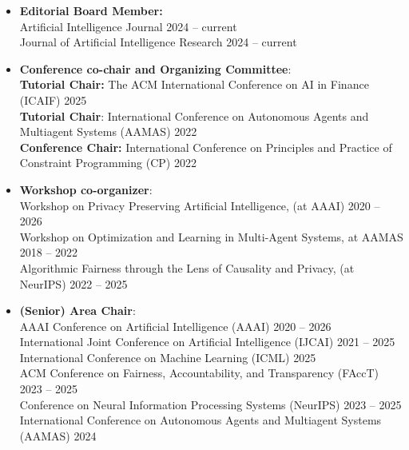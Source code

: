 \documentclass[localFont,alternative]{documentMETADATA}
\begin{document}
\vspace{6pt}
\vspace{6pt}
  \begin{itemize}
  	\item {\bf Editorial Board Member:}\\
  	Artificial Intelligence Journal \hfill{2024 -- current}\\
  	Journal of Artificial Intelligence Research \hfill{2024 -- current}

    \item {\bf Conference co-chair and Organizing Committee}:  \\
		{\bf Tutorial Chair:} The ACM International Conference on AI in Finance (ICAIF) \hfill{2025}\\
		{\bf Tutorial Chair}:  International Conference on Autonomous Agents and Multiagent Systems (AAMAS) \hfill{2022}\\
    {\bf Conference Chair:} International Conference on Principles and Practice of Constraint Programming (CP)  \hfill{2022}
		
    \item {\bf Workshop co-organizer}: \\
    {Workshop on Privacy Preserving Artificial Intelligence, (at AAAI)}   \hfill{2020 -- 2026}\\
    {Workshop on Optimization and Learning in Multi-Agent Systems, at AAMAS} \hfill{2018 -- 2022}\\
    {Algorithmic Fairness through the Lens of Causality and Privacy, (at NeurIPS)} \hfill{2022 -- 2025}
    
    \item {\bf (Senior) Area Chair}: \\
    AAAI Conference on Artificial Intelligence (AAAI) \hfill {2020 -- 2026}\\
    International Joint Conference on Artificial Intelligence (IJCAI) \hfill {2021 -- 2025}\\
    International Conference on Machine Learning (ICML) \hfill {2025}\\
    ACM Conference on Fairness, Accountability, and Transparency (FAccT) \hfill {2023 -- 2025}\\
  	Conference on Neural Information Processing Systems (NeurIPS) \hfill {2023 -- 2025} \\
    International Conference on Autonomous Agents and Multiagent Systems (AAMAS) \hfill{2024}
  \end{itemize}
\end{document}
